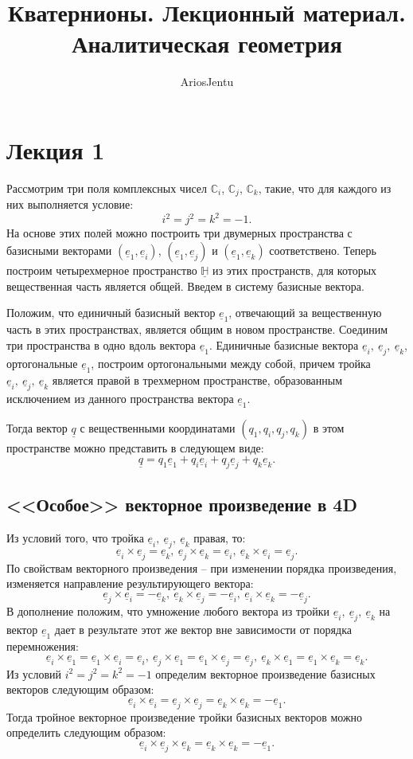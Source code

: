 \documentclass[fleqn]{extarticle}
\title{Кватернионы. Лекционный материал.\\Аналитическая геометрия}
\author{AriosJentu}
\date{}
\newcommand{\pares}[1]{ \left( #1 \right) }
\newcommand{\ue}{\underline{e}}
\begin{document}
	\maketitle
	
	\section{Лекция 1}

		Рассмотрим три поля комплексных чисел $\mathbb{C}_{i}$, $\mathbb{C}_{j}$, $\mathbb{C}_{k}$, такие, что для каждого из них выполняется условие:
		\[ i^2 = j^2 = k^2 = -1. \]
		На основе этих полей можно построить три двумерных пространства с базисными векторами $\pares{\ue_1, \ue_i}$, $\pares{\ue_1, \ue_j}$ и $\pares{\ue_1, \ue_k}$ соответствено.
		Теперь построим четырехмерное пространство $\mathbb{\underline{H}}$ из этих пространств, для которых вещественная часть является общей. 
		Введем в систему базисные вектора. 
		
		Положим, что единичный базисный вектор $\ue_1$, отвечающий за вещественную часть в этих пространствах, является общим в новом пространстве. 
		Соединим три пространства в одно вдоль вектора $\ue_1$. Единичные базисные вектора $\ue_i, ~ \ue_j, ~ \ue_k$, ортогональные $\ue_1$, 
		построим ортогональными между собой, причем тройка $\ue_i, ~ \ue_j, ~ \ue_k$ является правой в трехмерном пространстве, 
		образованным исключением из данного пространства вектора $\ue_1$.

		Тогда вектор $\underline{q}$ с вещественными координатами $(q_1, q_i, q_j, q_k)$ в этом пространстве можно представить в следующем виде:
		\[ \underline{q} = q_1 \ue_1 + q_i \ue_i + q_j \ue_j + q_k \ue_k. \]

		\subsection{<<Особое>> векторное произведение в 4D}
			Из условий того, что тройка $\ue_i, ~ \ue_j, ~ \ue_k$ правая, то:
			\[ \ue_i \times \ue_j = \ue_k, ~ \ue_j \times \ue_k = \ue_i, ~ \ue_k \times \ue_i = \ue_j. \]
			По свойствам векторного произведения -- при изменении порядка произведения, изменяется направление результирующего вектора:
			\[ \ue_j \times \ue_i = - \ue_k, ~ \ue_k \times \ue_j = - \ue_i, ~ \ue_i \times \ue_k = - \ue_j. \]
			В дополнение положим, что умножение любого вектора из тройки $\ue_i, ~ \ue_j, ~ \ue_k$ на вектор $\ue_1$ дает в результате этот же вектор вне зависимости от порядка перемножения:
			\[ \ue_i \times \ue_1 = \ue_1 \times \ue_i = \ue_i, ~ \ue_j \times \ue_1 = \ue_1 \times \ue_j = \ue_j, ~ \ue_k \times \ue_1 = \ue_1 \times \ue_k = \ue_k. \]
			Из условий $i^2 = j^2 = k^2 = -1$ определим векторное произведение базисных векторов следующим образом:
			\[ \ue_i \times \ue_i = \ue_j \times \ue_j = \ue_k \times \ue_k = - \ue_1. \]
			Тогда тройное векторное произведение тройки базисных векторов можно определить следующим образом: 
			\[ \ue_i \times \ue_j \times \ue_k = \ue_k \times \ue_k = - \ue_1. \]
\end{document}
